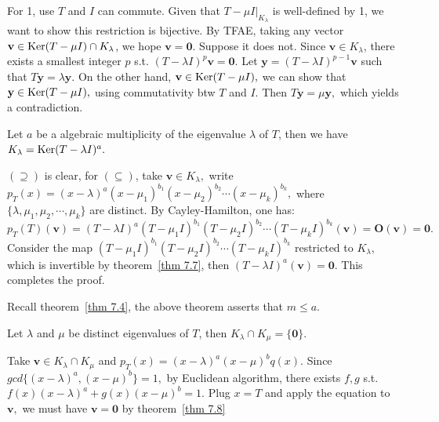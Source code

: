 \begin{pfbox}
    For 1, use $T$ and $I$ can commute. Given that $T-\mu I|_{K_\lambda}$ is well-defined by 1, we want to show this restriction is bijective.
    By TFAE, taking any vector $\mathbf{v}\in \operatorname{Ker}(T-\mu I)\cap K_\lambda$, we hope $\mathbf{v}=\mathbf{0}.$ Suppose it does not. Since $\mathbf{v}\in K_\lambda$, there exists a smallest integer $p$ s.t. $(T-\lambda I)^p\mathbf{v}=\mathbf{0}.$ Let $\mathbf{y}=(T-\lambda I)^{p-1}\mathbf{v}$ such that $T\mathbf{y}=\lambda\mathbf{y}$.
    On the other hand, $\mathbf{v}\in \operatorname{Ker}(T-\mu I),$ we can show that $\mathbf{y}\in\operatorname{Ker}(T-\mu I),$ using commutativity btw $T$ and $I$. Then $T\mathbf{y}=\mu\mathbf{y},$ which yields a contradiction. 
\end{pfbox}

\begin{theorem}
    Let $a$ be a algebraic multiplicity of the eigenvalue $\lambda$ of $T$, then we have $K_\lambda=\operatorname{Ker}(T-\lambda I)^a.$
    \label{thm 7.8}
\end{theorem}

\begin{pfbox}
    $(\supseteq)$ is clear, for $(\subseteq)$, take $\mathbf{v}\in K_\lambda,$ write $p_T(x)=(x-\lambda)^a(x-\mu_1)^{b_1}(x-\mu_2)^{b_2}\cdots(x-\mu_k)^{b_k},$ where $\{\lambda, \mu_1, \mu_2, \cdots, \mu_k\}$ are distinct.
    By Cayley-Hamilton, one has: $p_T(T)(\mathbf{v})=(T-\lambda I)^a(T-\mu_1 I)^{b_1}(T-\mu_2 I)^{b_2}\cdots(T-\mu_k I)^{b_k}(\mathbf{v}) = \mathbf{O}(\mathbf{v})=\mathbf{0}.$
    Consider the map $(T-\mu_1 I)^{b_1}(T-\mu_2 I)^{b_2}\cdots(T-\mu_k I)^{b_k}$ restricted to $K_\lambda$, which is invertible by theorem~\eqref{thm 7.7}, then $(T-\lambda I)^a(\mathbf{v})=\mathbf{0}.$ This completes the proof. 
\end{pfbox}

\begin{remark}
    Recall theorem~\eqref{thm 7.4}, the above theorem asserts that $m\le a$.
\end{remark}

\begin{theorem}
    Let $\lambda$ and $\mu$ be distinct eigenvalues of $T$, then $K_\lambda\cap K_\mu=\{\mathbf{0}\}.$
\end{theorem}
\begin{pfbox}
    Take $\mathbf{v}\in K_\lambda\cap K_\mu$ and $p_T(x)=(x-\lambda)^a(x-\mu)^bq(x).$ Since $gcd\{(x-\lambda)^a, (x-\mu)^b\}=1,$ by Euclidean algorithm, there exists $f,g$ s.t. $f(x)(x-\lambda)^a+g(x)(x-\mu)^b=1$.
    Plug $x=T$ and apply the equation to $\mathbf{v},$ we must have $\mathbf{v}=\mathbf{0}$ by theorem~\eqref{thm 7.8} 
\end{pfbox}


